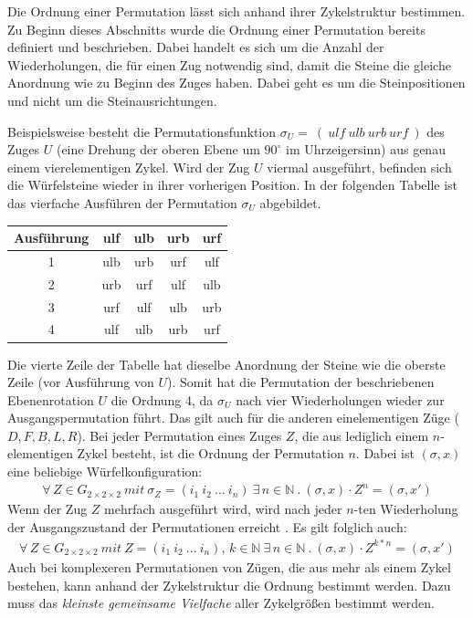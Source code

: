 \documentclass[12pt,a4paper, usenames, dvipsnames]{article}
\theoremstyle{mystyle}
\theoremstyle{definition}
\newcommand{\Gtwo}{\ensuremath{G_{2\times 2\times 2}}}
\begin{document}
Die Ordnung einer Permutation lässt sich anhand ihrer Zykelstruktur bestimmen. Zu Beginn dieses Abschnitts wurde die Ordnung einer Permutation bereits definiert und beschrieben. Dabei handelt es sich um die Anzahl der Wiederholungen, die für einen Zug notwendig sind, damit die Steine die gleiche Anordnung wie zu Beginn des Zuges haben. Dabei geht es um die Steinpositionen und nicht um die Steinausrichtungen.

Beispielsweise besteht die Permutationsfunktion $\sigma_U =\ ( \ \textit{ulf} \ \textit{ulb} \ \textit{urb} \ \textit{urf} \ ) $  des Zuges $U$ (eine Drehung der oberen Ebene um $90^\circ$ im Uhrzeigersinn) aus genau einem vierelementigen Zykel.
Wird der Zug $U$ viermal ausgeführt, befinden sich die Würfelsteine wieder in ihrer vorherigen Position. In der folgenden Tabelle ist das vierfache Ausführen der Permutation $\sigma_U$ abgebildet.
\begin{center}
\begin{tabular}{ccccc}
\toprule
\textbf{Ausführung} & \textbf{ulf} & \textbf{ulb} & \textbf{urb} & \textbf{urf} \\
\midrule
1 & ulb & urb & urf & ulf \\

2 & urb & urf & ulf & ulb \\

3 & urf & ulf & ulb & urb \\

4 & ulf & ulb & urb & urf \\
\bottomrule
\end{tabular}
\end{center}

Die vierte Zeile der Tabelle hat dieselbe Anordnung der Steine wie die oberste Zeile (vor Ausführung von $U$). 
Somit hat die Permutation der beschriebenen Ebenenrotation $U$ die Ordnung 4, da $\sigma_U$ nach vier Wiederholungen wieder zur Ausgangspermutation führt. Das gilt auch für die anderen einelementigen Züge ($D, F, B, L, R$).
Bei jeder Permutation eines Zuges $Z$, die aus lediglich einem $n$-elementigen Zykel besteht, ist die Ordnung der Permutation $n$. Dabei ist $(\sigma, x)$ eine beliebige Würfelkonfiguration:
\begin{align*}
\forall \, Z \in \Gtwo \ \textit{mit} \ \sigma_Z=(i_1 \ i_2 \ ... \ i_n) \ \exists \, n \in \mathbb{N} \ . \  (\sigma, x) \cdot Z^n= (\sigma, x')
\end{align*}
Wenn der Zug $Z$ mehrfach ausgeführt wird, wird nach jeder $n$-ten Wiederholung der Ausgangszustand der Permutationen erreicht \cite{TD}. 
Es gilt folglich auch:
\begin{align*}
\forall \, Z \in \Gtwo \ \textit{mit} \ Z=(i_1 \ i_2 \ ... \ i_n), \, k \in \mathbb{N} \ \exists \, n \in \mathbb{N} \ . \  {(\sigma, x) \cdot Z^{k*n}=(\sigma, x') }
\end{align*}
Auch bei komplexeren Permutationen von Zügen, die aus mehr als einem Zykel bestehen, kann anhand der Zykelstruktur die Ordnung bestimmt werden. Dazu muss das \textit{kleinste gemeinsame Vielfache} aller Zykelgrößen bestimmt werden. \cite{TD}
\end{document}
